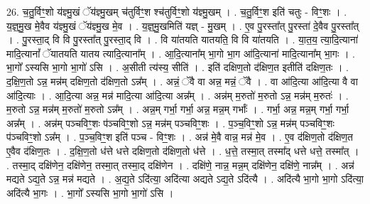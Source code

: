 \documentclass[17pt]{extarticle}
\begin{document}
26. च॒तु॒र्विꣳ॒॒शो य॑ज्ञ्मु॒खं ॅय॑ज्ञ्मु॒खम् च॑तुर्विꣳ॒॒श श्च॑तुर्विꣳ॒॒शो य॑ज्ञ्मु॒खम् । . च॒तु॒र्विꣳ॒॒श इति॑ चतुः - विꣳ॒॒शः । . य॒ज्ञ्॒मु॒ख मे॒वैव य॑ज्ञ्मु॒खं ॅय॑ज्ञ्मु॒ख मे॒व । . य॒ज्ञ्॒मु॒खमिति॑ यज्ञ् - मु॒खम् । . ए॒व पु॒रस्ता᳚त् पु॒रस्ता॑ दे॒वैव पु॒रस्ता᳚त् । . पु॒रस्ता॒द् वि वि पु॒रस्ता᳚त् पु॒रस्ता॒द् वि । . वि या॑तयति यातयति॒ वि वि या॑तयति । . या॒त॒य॒ त्या॒दि॒त्याना॑ मादि॒त्यानां᳚ ॅयातयति यातय त्यादि॒त्याना᳚म् । . आ॒दि॒त्याना᳚म् भा॒गो भा॒ग आ॑दि॒त्याना॑ मादि॒त्याना᳚म् भा॒गः । . भा॒गो᳚ ऽस्यसि भा॒गो भा॒गो॑ ऽसि । . अ॒सीती त्य॑स्य॒ सीति॑ । . इति॑ दक्षिण॒तो द॑क्षिण॒त इतीति॑ दक्षिण॒तः । . द॒क्षि॒ण॒तो ऽन्न॒ मन्न॑म् दक्षिण॒तो द॑क्षिण॒तो ऽन्न᳚म् । . अन्नं॒ ॅवै वा अन्न॒ मन्नं॒ ॅवै । . वा आ॑दि॒त्या आ॑दि॒त्या वै वा आ॑दि॒त्याः । . आ॒दि॒त्या अन्न॒ मन्न॑ मादि॒त्या आ॑दि॒त्या अन्न᳚म् । . अन्न॑म् म॒रुतो॑ म॒रुतो ऽन्न॒ मन्न॑म् म॒रुतः॑ । . म॒रुतो ऽन्न॒ मन्न॑म् म॒रुतो॑ म॒रुतो ऽन्न᳚म् । . अन्न॒म् गर्भा॒ गर्भा॒ अन्न॒ मन्न॒म् गर्भाः᳚ । . गर्भा॒ अन्न॒ मन्न॒म् गर्भा॒ गर्भा॒ अन्न᳚म् । . अन्न॑म् पञ्चविꣳ॒॒शः प॑ञ्चविꣳ॒॒शो ऽन्न॒ मन्न॑म् पञ्चविꣳ॒॒शः । . प॒ञ्च॒विꣳ॒॒शो ऽन्न॒ मन्न॑म् पञ्चविꣳ॒॒शः प॑ञ्चविꣳ॒॒शो ऽन्न᳚म् । . प॒ञ्च॒विꣳ॒॒श इति॑ पञ्च - विꣳ॒॒शः । . अन्न॑ मे॒वै वान्न॒ मन्न॑ मे॒व । . ए॒व द॑क्षिण॒तो द॑क्षिण॒त ए॒वैव द॑क्षिण॒तः । . द॒क्षि॒ण॒तो ध॑त्ते धत्ते दक्षिण॒तो द॑क्षिण॒तो ध॑त्ते । . ध॒त्ते॒ तस्मा॒त् तस्मा᳚द् धत्ते धत्ते॒ तस्मा᳚त् । . तस्मा॒द् दक्षि॑णेन॒ दक्षि॑णेन॒ तस्मा॒त् तस्मा॒द् दक्षि॑णेन । . दक्षि॑णे॒ नान्न॒ मन्न॒म् दक्षि॑णेन॒ दक्षि॑णे॒ नान्न᳚म् । . अन्न॑ मद्यते ऽद्य॒ते ऽन्न॒ मन्न॑ मद्यते । . अ॒द्य॒ते ऽदि॑त्या॒ अदि॑त्या अद्यते ऽद्य॒ते ऽदि॑त्यै । . अदि॑त्यै भा॒गो भा॒गो ऽदि॑त्या॒ अदि॑त्यै भा॒गः । . भा॒गो᳚ ऽस्यसि भा॒गो भा॒गो॑ ऽसि । \newline
\end{document}
